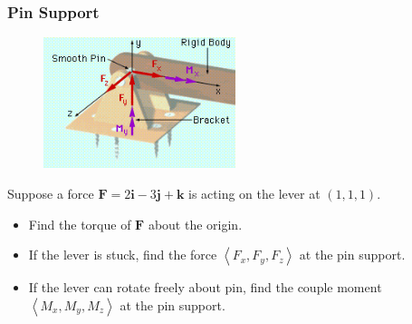 \documentclass[10pt]{beamer}
\newcommand{\inpr}[1]{\left\langle#1\right\rangle}
\begin{document}
\begin{frame}
\frametitle{Pin Support}
\begin{figure}[h]
\includegraphics[width = 0.5\textwidth]{pinSupport.jpg}
\end{figure}
Suppose a force $\mathbf F = 2\mathbf i - 3\mathbf j + \mathbf k$ is acting on the lever at $(1,1,1)$. 
\begin{itemize}[label = $\bullet$]
\item
Find the torque of $\mathbf  F$ about the origin.
\item If the lever is stuck, find the force $\inpr{F_x, F_y, F_z}$ at the pin support.
\item If the lever can rotate freely about pin, find the couple moment $\inpr{M_x, M_y, M_z}$ at the pin support.
\end{itemize}
\end{frame}
\end{document}
